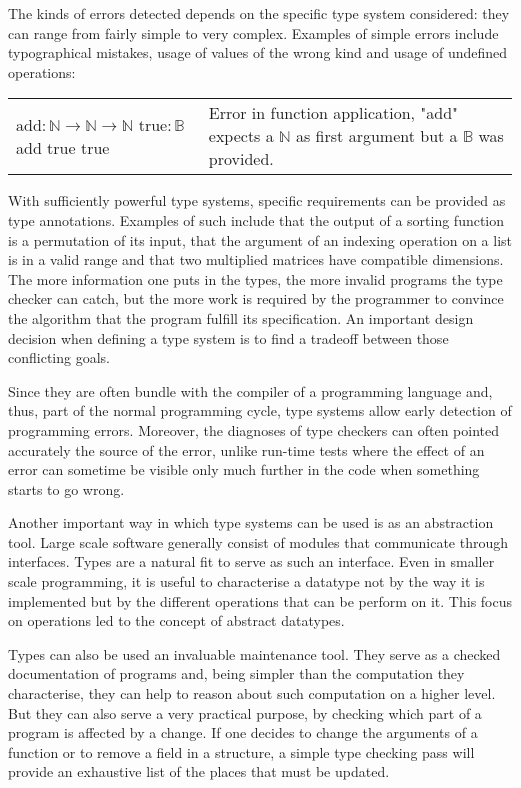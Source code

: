 The kinds of errors detected depends on the specific type system considered: they can range from
fairly simple to very complex. Examples of simple errors include typographical mistakes, usage of
values of the wrong kind and usage of undefined operations:

\begin{center}
  \begin{tabular}{m{3.5cm} | m{5.5cm}}
    $\text{add} : \mathbb{N} \to \mathbb{N} \to \mathbb{N}$ \newline
    $\text{true} : \mathbb{B}$ \newline
    add true true
    & Error in function application, "add" expects a $\mathbb{N}$ as first argument but a
    $\mathbb{B}$ was provided.
  \end{tabular}
\end{center}

With sufficiently powerful type systems, specific requirements can be provided as type annotations.
Examples of such include that the output of a sorting function is a permutation of its input, that
the argument of an indexing operation on a list is in a valid range and that two multiplied matrices
have compatible dimensions. The more information one puts in the types, the more invalid programs
the type checker can catch, but the more work is required by the programmer to convince the
algorithm that the program fulfill its specification. An important design decision when defining
a type system is to find a tradeoff between those conflicting goals.

Since they are often bundle with the compiler of a programming language and, thus, part of the
normal programming cycle, type systems allow early detection of programming errors. Moreover, the
diagnoses of type checkers can often pointed accurately the source of the error, unlike run-time
tests where the effect of an error can sometime be visible only much further in the code when
something starts to go wrong.

Another important way in which type systems can be used is as an abstraction tool. Large scale
software generally consist of modules that communicate through interfaces. Types are a natural fit
to serve as such an interface. Even in smaller scale programming, it is useful to characterise a
datatype not by the way it is implemented but by the different operations that can be perform on it.
This focus on operations led to the concept of abstract datatypes.

Types can also be used an invaluable maintenance tool. They serve as a checked documentation of
programs and, being simpler than the computation they characterise, they can help to reason about
such computation on a higher level. But they can also serve a very practical purpose, by checking
which part of a program is affected by a change. If one decides to change the arguments of a
function or to remove a field in a structure, a simple type checking pass will provide an exhaustive
list of the places that must be updated.

